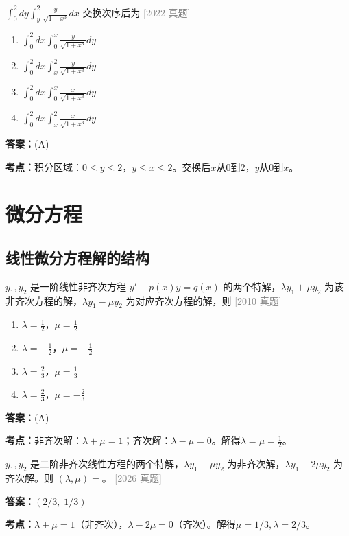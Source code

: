 \documentclass[12pt,a4paper]{ctexbook}
\newcommand{\src}[1]{\hfill\textcolor{gray}{\small\textsf{[#1]}}}
\newcommand{\ans}[1]{\begin{answerbox}\textbf{答案：}#1\end{answerbox}}
\newcommand{\kpt}[1]{\textbf{考点：}#1}
\begin{document}
\bigskip

\begin{exercise}
$\int_0^2 dy\int_y^2 \frac{y}{\sqrt{1+x^3}}dx$ 交换次序后为 \hfill\src{2022 真题}
\begin{enumerate}[label=(\Alph*),nosep]
  \item $\int_0^2 dx\int_0^x \frac{y}{\sqrt{1+x^3}}dy$
  \item $\int_0^2 dx\int_x^2 \frac{y}{\sqrt{1+x^3}}dy$
  \item $\int_0^2 dx\int_0^x \frac{x}{\sqrt{1+x^3}}dy$
  \item $\int_0^2 dx\int_x^2 \frac{x}{\sqrt{1+x^3}}dy$
\end{enumerate}
\end{exercise}
\ans{(A)}
\kpt{积分区域：$0\leqslant y\leqslant 2$，$y\leqslant x\leqslant 2$。交换后$x$从$0$到$2$，$y$从$0$到$x$。}

\newpage

\chapter{微分方程}

\section{线性微分方程解的结构}

\begin{exercise}
$y_1,y_2$ 是一阶线性非齐次方程 $y'+p(x)y=q(x)$ 的两个特解，$\lambda y_1+\mu y_2$ 为该非齐次方程的解，$\lambda y_1-\mu y_2$ 为对应齐次方程的解，则 \hfill\src{2010 真题}
\begin{enumerate}[label=(\Alph*),nosep]
  \item $\lambda=\frac{1}{2}$，$\mu=\frac{1}{2}$
  \item $\lambda=-\frac{1}{2}$，$\mu=-\frac{1}{2}$
  \item $\lambda=\frac{2}{3}$，$\mu=\frac{1}{3}$
  \item $\lambda=\frac{2}{3}$，$\mu=-\frac{2}{3}$
\end{enumerate}
\end{exercise}
\ans{(A)}
\kpt{非齐次解：$\lambda+\mu=1$；齐次解：$\lambda-\mu=0$。解得$\lambda=\mu=\frac{1}{2}$。}

\bigskip

\begin{exercise}
$y_1,y_2$ 是二阶非齐次线性方程的两个特解，$\lambda y_1+\mu y_2$ 为非齐次解，$\lambda y_1-2\mu y_2$ 为齐次解。则 $(\lambda,\mu)=$\underline{\hspace{1cm}}。
\src{2026 真题}
\end{exercise}
\ans{$(2/3,\;1/3)$}
\kpt{$\lambda+\mu=1$（非齐次），$\lambda-2\mu=0$（齐次）。解得$\mu=1/3,\lambda=2/3$。}
\end{document}
